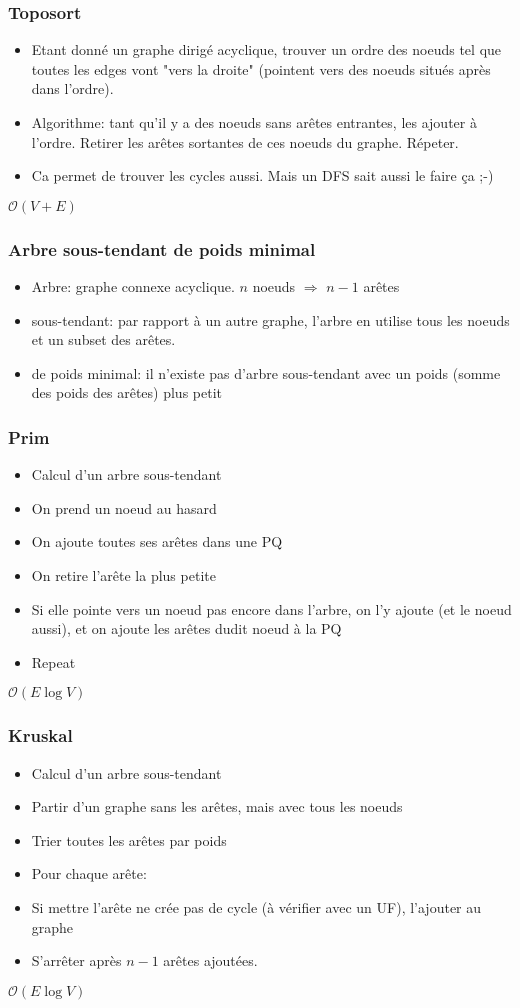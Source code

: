 \documentclass[8pt,aspectratio=169]{beamer}
\begin{document}
\begin{frame}
\frametitle{Toposort}
\begin{itemize}
	\item Etant donné un graphe dirigé acyclique, trouver un ordre des noeuds tel que toutes les edges vont "vers la droite" (pointent vers des noeuds situés après dans l'ordre).
	\item Algorithme: tant qu'il y a des noeuds sans arêtes entrantes, les ajouter à l'ordre. Retirer les arêtes sortantes de ces noeuds du graphe. Répeter.
	\item Ca permet de trouver les cycles aussi. Mais un DFS sait aussi le faire ça ;-)
\end{itemize}
$\mathcal{O}(V+E)$
\end{frame}

\begin{frame}
\frametitle{Arbre sous-tendant de poids minimal}
\begin{itemize}
	\item Arbre: graphe connexe acyclique. $n$ noeuds $\Rightarrow$ $n-1$ arêtes
	\item sous-tendant: par rapport à un autre graphe, l'arbre en utilise tous les noeuds et un subset des arêtes.
	\item de poids minimal: il n'existe pas d'arbre sous-tendant avec un poids (somme des poids des arêtes) plus petit
\end{itemize}
\end{frame}

\begin{frame}
\frametitle{Prim}
\begin{itemize}
	\item Calcul d'un arbre sous-tendant
	\item On prend un noeud au hasard
	\item On ajoute toutes ses arêtes dans une PQ
	\item On retire l'arête la plus petite
	\item Si elle pointe vers un noeud pas encore dans l'arbre, on l'y ajoute (et le noeud aussi), et on ajoute les arêtes dudit noeud à la PQ
	\item Repeat
\end{itemize}
$\mathcal{O}(E \log V)$
\end{frame}

\begin{frame}
\frametitle{Kruskal}
\begin{itemize}
	\item Calcul d'un arbre sous-tendant
	\item Partir d'un graphe sans les arêtes, mais avec tous les noeuds
	\item Trier toutes les arêtes par poids
	\item Pour chaque arête:
	\item Si mettre l'arête ne crée pas de cycle (à vérifier avec un UF), l'ajouter au graphe
	\item S'arrêter après $n-1$ arêtes ajoutées.
\end{itemize}
$\mathcal{O}(E \log V)$
\end{frame}
\end{document}

